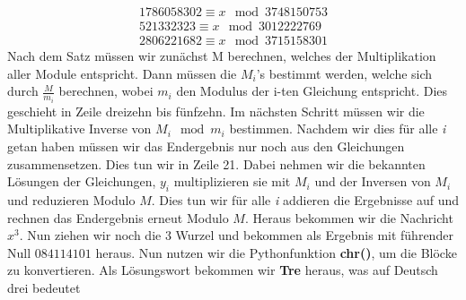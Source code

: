 \documentclass{article}
\begin{document}
\begin{align}
1786058302 \equiv x \mod 3748150753 \\
521332323  \equiv x \mod 3012222769 \\
2806221682 \equiv x \mod 3715158301 
\end{align}
Nach dem Satz müssen wir zunächst M berechnen, welches der Multiplikation aller Module entspricht. Dann müssen die $M_i$'s bestimmt werden, welche sich durch $\frac{M}{m_i}$ berechnen, wobei $m_i$ den Modulus der i-ten Gleichung entspricht. Dies geschieht in Zeile dreizehn bis fünfzehn. Im nächsten Schritt müssen wir die Multiplikative Inverse von $M_i \mod{m_i}$ bestimmen. Nachdem wir dies für alle \textit{i} getan haben müssen wir das Endergebnis nur noch aus den Gleichungen zusammensetzen. Dies tun wir in Zeile 21. Dabei nehmen wir die bekannten Lösungen der Gleichungen, $y_i$ multiplizieren sie mit $M_i$ und der Inversen von $M_i$ und reduzieren Modulo $M$. Dies tun wir für alle \textit{i} addieren die Ergebnisse auf und rechnen das Endergebnis erneut Modulo $M$.
Heraus bekommen wir die Nachricht $x^3$. Nun ziehen wir noch die 3 Wurzel und bekommen als Ergebnis mit führender Null $084114101$ heraus. Nun nutzen wir die Pythonfunktion \textbf{chr()}, um die Blöcke zu konvertieren. Als Lösungswort bekommen wir \textbf{Tre} heraus, was auf Deutsch drei bedeutet
\newpage
\end{document}

